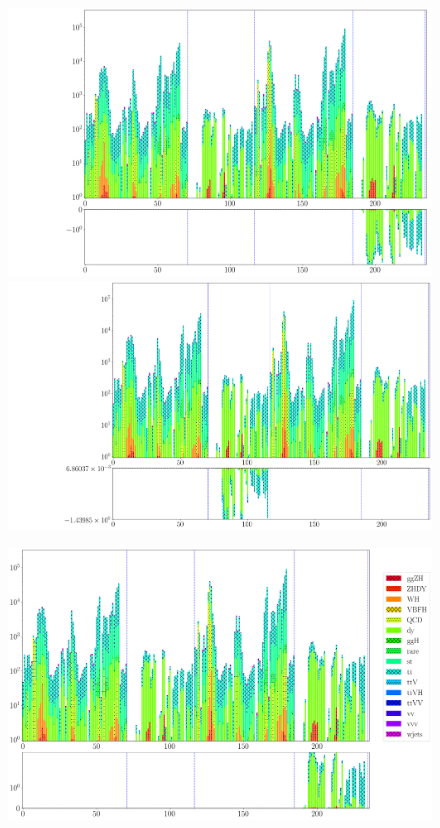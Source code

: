 \begin{figure}[h!]
	\centering
	\begin{minipage}{.5\textwidth}
		\centering
		\includegraphics[width=\linewidth]{figures/network_setup/trigger_mumu_sf_-0.5}
		\includegraphics[width=\linewidth]{figures/network_setup/trigger_ee_sf_-0.5}
	\end{minipage}%
	\begin{minipage}{.5\textwidth}
		\centering
		\includegraphics[width=\linewidth]{figures/network_setup/trigger_mumu_sf_+0.5}

\end{minipage}
\end{figure}
